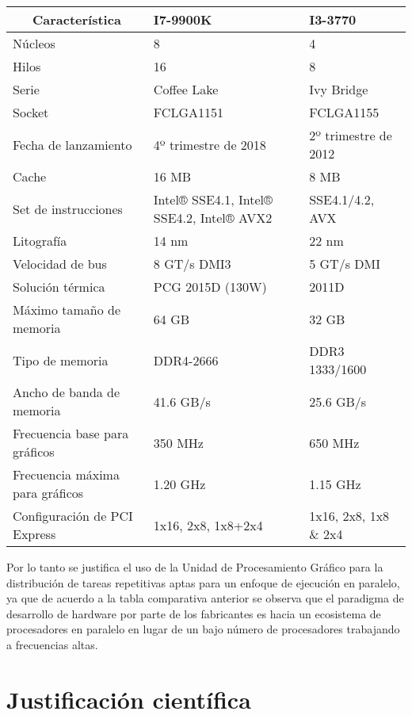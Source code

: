 \documentclass[../main.tex]{subfiles}
\begin{document}
  \begin{table}[]
    \begin{tabular}{|p{5.6cm}|p{4cm}|p{4cm}|}
      \hline
      \multicolumn{1}{|c|}{\textbf{Característica}} & \textbf{I7-9900K} & \textbf{I3-3770} \\ \hline
      Núcleos & 8 & 4 \\ \hline
      Hilos & 16 & 8 \\ \hline
      Serie & Coffee Lake & Ivy Bridge \\ \hline
      Socket & FCLGA1151 & FCLGA1155 \\ \hline
      Fecha de lanzamiento & 4º trimestre de 2018 & 2º trimestre de 2012 \\ \hline
      Cache & 16 MB & 8 MB \\ \hline
      Set de instrucciones & Intel® SSE4.1, Intel® SSE4.2, Intel® AVX2 & SSE4.1/4.2, AVX \\ \hline
      Litografía & 14 nm & 22 nm \\ \hline
      Velocidad de bus & 8 GT/s DMI3 & 5 GT/s DMI \\ \hline
      Solución térmica & PCG 2015D (130W) & 2011D \\ \hline
      Máximo tamaño de memoria & 64 GB & 32 GB \\ \hline
      Tipo de memoria & DDR4-2666 & DDR3 1333/1600 \\ \hline
      Ancho de banda de memoria & 41.6 GB/s & 25.6 GB/s \\ \hline
      Frecuencia base para gráficos & 350 MHz & 650 MHz \\ \hline
      Frecuencia máxima para gráficos & 1.20 GHz & 1.15 GHz \\ \hline
      Configuración de PCI Express & 1x16, 2x8, 1x8+2x4 & 1x16, 2x8, 1x8 \& 2x4 \\ \hline
    \end{tabular}
  \end{table}

  Por lo tanto se justifica el uso de la Unidad de Procesamiento Gráfico para la distribución de tareas repetitivas aptas para un enfoque de ejecución en paralelo, ya que de acuerdo a la tabla comparativa anterior se observa que el paradigma de desarrollo de hardware por parte de los fabricantes es hacia un ecosistema de procesadores en paralelo en lugar de un bajo número de procesadores trabajando a frecuencias altas.

  \section{Justificación científica}
\end{document}
